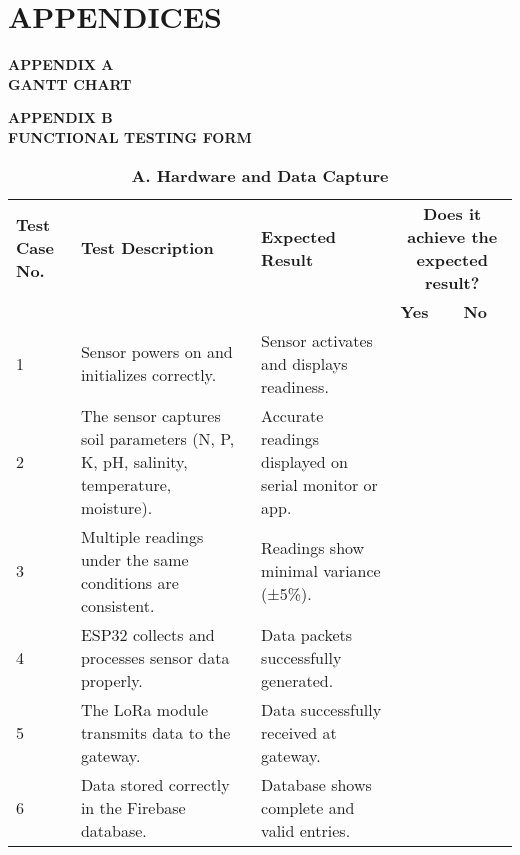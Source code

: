 \chapter*{APPENDICES}

{\baselineskip
	\centering
	
	\textbf{APPENDIX A}\\[1em]
	\textbf{GANTT CHART}
	
	\newpage
	
	\textbf{APPENDIX B}\\[1em]
	\textbf{FUNCTIONAL TESTING FORM}
	
	\begin{table}[H]
		\centering
		\renewcommand{\arraystretch}{1.3}
		\caption*{\textbf{A. Hardware and Data Capture}}
		\begin{tabular}{|p{1.2cm}|p{4.2cm}|p{4.2cm}|p{2cm}|p{2cm}|}
			\hline
			\textbf{Test Case No.} & \textbf{Test Description} & \textbf{Expected Result} &
			\multicolumn{2}{|c|}{\textbf{Does it achieve the expected result?}} \\ \cline{4-5}
			& & & \textbf{Yes} & \textbf{No} \\ \hline
			1 & Sensor powers on and initializes correctly. & Sensor activates and displays readiness. & & \\ \hline
			2 & The sensor captures soil parameters (N, P, K, pH, salinity, temperature, moisture). & Accurate readings displayed on serial monitor or app. & & \\ \hline
			3 & Multiple readings under the same conditions are consistent. & Readings show minimal variance (±5\%). & & \\ \hline
			4 & ESP32 collects and processes sensor data properly. & Data packets successfully generated. & & \\ \hline
			5 & The LoRa module transmits data to the gateway. & Data successfully received at gateway. & & \\ \hline
			6 & Data stored correctly in the Firebase database. & Database shows complete and valid entries. & & \\ \hline
		\end{tabular}
	\end{table}
	
}
